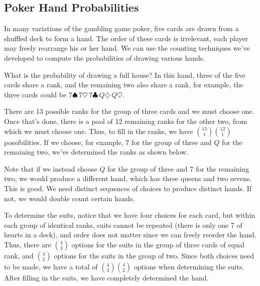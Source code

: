 \subsection*{Poker Hand Probabilities}

In many variations of the gambling game poker, five cards are drawn from a shuffled deck to form a hand. The order of these cards is irrelevant, each player may freely rearrange his or her hand. We can use the counting techniques we've developed to compute the probabilities of drawing various hands.

\begin{examp}What is the probability of drawing a full house? In this hand, three of the five cards share a rank, and the remaining two also share a rank, for example, the three cards could be $7 \spadesuit \, 7\heartsuit \, 7 \clubsuit \, Q \diamondsuit \, Q \heartsuit$.
\par
\noindent There are 13 possible ranks for the group of three cards and we must choose one. Once that's done, there is a pool of 12 remaining ranks for the other two, from which we must choose one. Thus, to fill in the ranks, we have $\binom{13}{1}\binom{12}{1}$ possibilities. If we choose, for example, $7$ for the group of three and $Q$ for the remaining two, we've determined the ranks as shown below.

\vspace{-1em}
\begin{center}
\end{center}
\vspace{-1em}

\noindent Note that if we instead choose $Q$ for the group of three and $7$ for the remaining two, we would produce a different hand, which has three queens and two sevens. This is good. We need distinct sequences of choices to produce distinct hands. If not, we would double count certain hands.
\par
\noindent To determine the suits, notice that we have four choices for each card, but within each group of identical ranks, suits cannot be repeated (there is only one 7 of hearts in a deck), and order does not matter since we can freely reorder the hand. Thus, there are $\binom{4}{3}$ options for the suits in the group of three cards of equal rank, and $\binom{4}{2}$ options for the suits in the group of two. Since both choices need to be made, we have a total of $\binom{4}{3}\binom{4}{2}$ options when determining the suits. After filling in the suits, we have completely determined the hand.


\end{examp}
